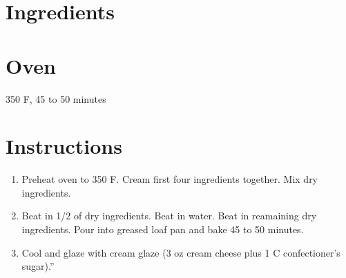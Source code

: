 \documentclass[letterpaper,10pt,english]{sphinxmanual}
\begin{document}
\section{Ingredients}
\label{\detokenize{Pumpkin_Bread:ingredients}}
%
\begin{sphinxVerbatim}[commandchars=\\\{\}]
   

   

 

   

  

     

          

  

  

   

     
\end{sphinxVerbatim}


\section{Oven}
\label{\detokenize{Pumpkin_Bread:oven}}
350 F, 45 to 50 minutes


\section{Instructions}
\label{\detokenize{Pumpkin_Bread:instructions}}\begin{enumerate}
\item {} 
Preheat oven to 350 F.  Cream first four ingredients together.  Mix dry ingredients.

\item {} 
Beat in 1/2 of dry ingredients.  Beat in water.  Beat in reamaining dry ingredients.  Pour into greased loaf pan and bake 45 to 50 minutes.

\item {} 
Cool and glaze with cream glaze (3 oz cream cheese plus 1 C confectioner’s sugar).”

\end{enumerate}
\end{document}
